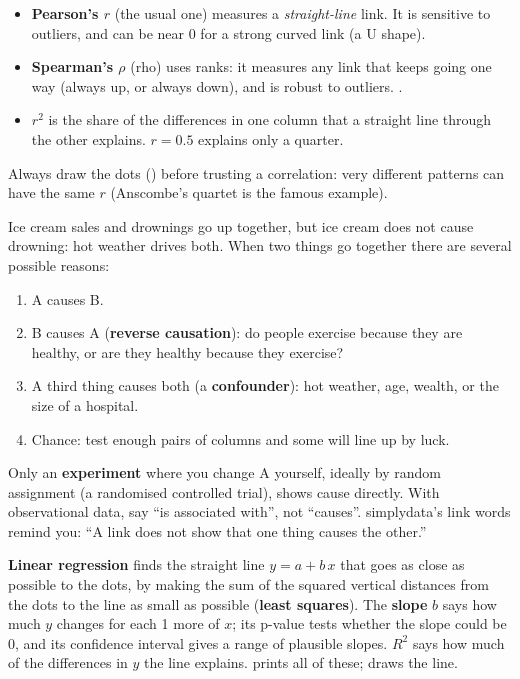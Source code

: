\begin{itemize}
  \item \textbf{Pearson's $r$} (the usual one) measures a \emph{straight-line} link. It is
    sensitive to outliers, and can be near 0 for a strong curved link (a U shape).
  \item \textbf{Spearman's $\rho$} (rho) uses ranks: it measures any link that keeps going one way
    (always up, or always down), and is robust to outliers.
    .
  \item $r^2$ is the share of the differences in one column that a straight line through the other
    explains. $r = 0.5$ explains only a quarter.
\end{itemize}

Always draw the dots () before trusting a correlation: very different patterns
can have the same $r$ (Anscombe's quartet is the famous example).


Ice cream sales and drownings go up together, but ice cream does not cause drowning: hot weather
drives both. When two things go together there are several possible reasons:

\begin{enumerate}
  \item A causes B.
  \item B causes A (\textbf{reverse causation}): do people exercise because they are healthy, or
    are they healthy because they exercise?
  \item A third thing causes both (a \textbf{confounder}): hot weather, age, wealth, or the size of
    a hospital.
  \item Chance: test enough pairs of columns and some will line up by luck.
\end{enumerate}

Only an \textbf{experiment} where you change A yourself, ideally by random assignment (a
randomised controlled trial), shows cause directly. With observational data, say ``is associated
with'', not ``causes''. simplydata's link words remind you: ``A link does not show that one thing
causes the other.''


\textbf{Linear regression} finds the straight line $y = a + b\,x$ that goes as close as possible to
the dots, by making the sum of the squared vertical distances from the dots to the line as small as
possible (\textbf{least squares}). The \textbf{slope} $b$ says how much $y$ changes for each 1 more
of $x$; its p-value tests whether the slope could be 0, and its confidence interval gives a range of
plausible slopes. $R^2$ says how much of the differences in $y$ the line explains.
 prints all of these;
 draws the line.

